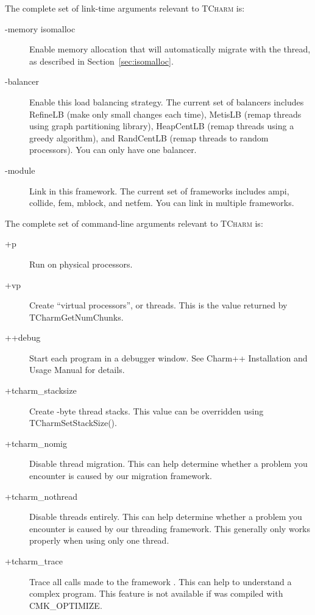 \documentclass[10pt]{article}
\newcommand{\tcharm}{\textsc{TCharm}}
\begin{document}
The complete set of link-time arguments relevant to \tcharm{} is:
\begin{description}
\item[-memory isomalloc] Enable memory allocation that will automatically
migrate with the thread, as described in Section~\ref{sec:isomalloc}.

\item[-balancer ] Enable this load balancing strategy.  The
current set of balancers  includes RefineLB (make only small changes
each time), MetisLB (remap threads using graph partitioning library), 
HeapCentLB (remap threads using a greedy algorithm), and RandCentLB
(remap threads to random processors).  You can only have one balancer.

\item[-module ] Link in this framework.  The current set of frameworks
 includes ampi, collide, fem, mblock, and netfem.  You can link in 
multiple frameworks.

\end{description}

The complete set of command-line arguments relevant to \tcharm{} is:

\begin{description}
\item[+p ] Run on  physical processors.

\item[+vp ] Create  ``virtual processors'', or threads.  This is
the value returned by TCharmGetNumChunks.

\item[++debug] Start each program in a debugger window.  See Charm++
Installation and Usage Manual for details.

\item[+tcharm\_stacksize ] Create -byte thread stacks.  This
value can be overridden using TCharmSetStackSize().

\item[+tcharm\_nomig] Disable thread migration.  This can help determine
whether a problem you encounter is caused by our migration framework.

\item[+tcharm\_nothread] Disable threads entirely.  This can help determine
whether a problem you encounter is caused by our threading framework.
This generally only works properly when using only one thread.

\item[+tcharm\_trace ] Trace all calls made to the framework .
This can help to understand a complex program.  This feature is not
available if \charmpp{} was compiled with CMK\_OPTIMIZE.

\end{description}
\end{document}
